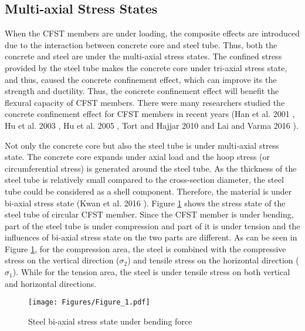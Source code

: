 \documentclass[12pt,a4]{article}
\begin{document}
	\subsection{Multi-axial Stress States}
	When the CFST members are under loading, the composite effects are introduced due to the interaction between concrete core and steel tube. Thus, both the concrete and steel are under the multi-axial stress states. The confined stress provided by the steel tube makes the concrete core under tri-axial stress state, and thus, caused the concrete confinement effect, which can improve its the strength and ductility. Thus, the concrete confinement effect will benefit the flexural capacity of CFST members. There were many researchers studied the concrete confinement effect for CFST members in recent years (Han et al. 2001 \cite{RN23}, Hu et al. 2003 \cite{RN1}, Hu et al. 2005 \cite{RN29}, Tort and Hajjar 2010 \cite{RN46} and Lai and Varma 2016 \cite{RN32}).
	\par
	Not only the concrete core but also the steel tube is under multi-axial stress state. The concrete core expands under axial load and the hoop stress (or circumferential stress) is generated around the steel tube. As the thickness of the steel tube is relatively small compared to the cross-section diameter, the steel tube could be considered as a shell component. Therefore, the material is under bi-axial stress state (Kwan et al. 2016 \cite{RN31}). Figure \ref{fig-1} shows the stress state of the steel tube of circular CFST member. Since the CFST member is under bending, part of the steel tube is under compression and part of it is under tension and the influences of bi-axial stress state on the two parts are different. As can be seen in Figure \ref{fig-1}, for the compression area, the steel is combined with the compressive stress on the vertical direction ($\sigma_2$) and tensile stress on the horizontal direction ($\sigma_1$). While for the tension area, the steel is under tensile stress on both vertical and horizontal directions.
	\par
	\begin{figure}[h]
		\centering
		\texttt{[image: Figures/Figure\_1.pdf]}
		\caption{Steel bi-axial stress state under bending force}
		\label{fig-1}
	\end{figure}
	\par
\end{document}
